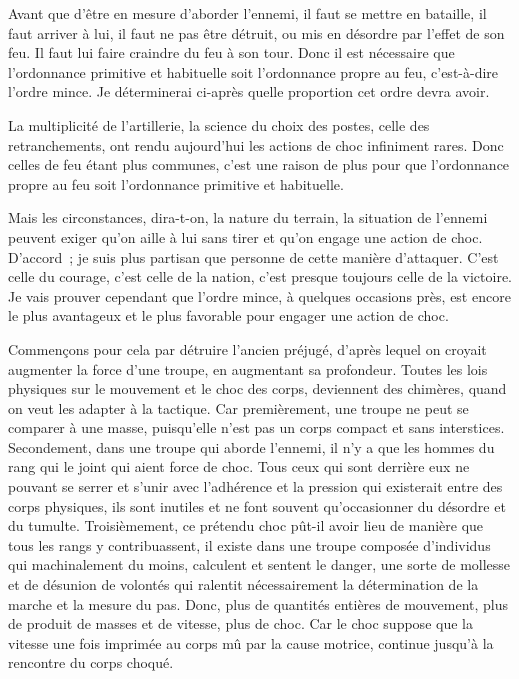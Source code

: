 \documentclass[french,twoside]{book} %
\begin{document}
Avant que d’être en mesure d’aborder l’ennemi, il faut se mettre en bataille, il faut arriver à lui, il faut ne pas être détruit, ou mis en désordre par l’effet de son feu. Il faut lui faire craindre du feu à son tour. Donc il est nécessaire que l’ordonnance primitive et habituelle soit l’ordonnance propre au feu, c’est-à-dire l’ordre mince. Je déterminerai ci-après quelle proportion cet ordre devra avoir.\par
La multiplicité de l’artillerie, la science du choix des postes, celle des retranchements, ont rendu aujourd’hui les actions de choc infiniment rares. Donc celles de feu étant plus communes, c’est une raison de plus pour que l’ordonnance propre au feu soit l’ordonnance primitive et habituelle.\par
Mais les circonstances, dira-t-on, la nature du terrain, la situation de l’ennemi peuvent exiger qu’on aille à lui sans tirer et qu’on engage une action de choc. D’accord ; je suis plus partisan que personne de cette manière d’attaquer. C’est celle du courage, c’est celle de la nation, c’est presque toujours celle de la victoire. Je vais prouver cependant que l’ordre mince, à quelques occasions près, est encore le plus avantageux et le plus favorable pour engager une action de choc.\par
Commençons pour cela par détruire l’ancien préjugé, d’après lequel on croyait augmenter la force d’une troupe, en augmentant sa profondeur. Toutes les lois physiques sur le mouvement et le choc des corps, deviennent des chimères, quand on veut les adapter à la tactique. Car premièrement, une troupe ne peut se comparer à une masse, puisqu’elle n’est pas un corps compact et sans interstices. Secondement, dans une troupe qui aborde l’ennemi, il n’y a que les hommes du rang qui le joint qui aient force de choc. Tous ceux qui sont derrière eux ne pouvant se serrer et s’unir avec l’adhérence et la pression qui existerait entre des corps physiques, ils sont inutiles et ne font souvent qu’occasionner du désordre et du tumulte. Troisièmement, ce prétendu choc pût-il avoir lieu de manière que tous les rangs y contribuassent, il existe dans une troupe composée d’individus qui machinalement du moins, calculent et sentent le danger, une sorte de mollesse et de désunion de volontés qui ralentit nécessairement la détermination de la marche et la mesure du pas. Donc, plus de quantités entières de mouvement, plus de produit de masses et de vitesse, plus de choc. Car le choc suppose que la vitesse une fois imprimée au corps mû par la cause motrice, continue jusqu’à la rencontre du corps choqué.\par
\end{document}
